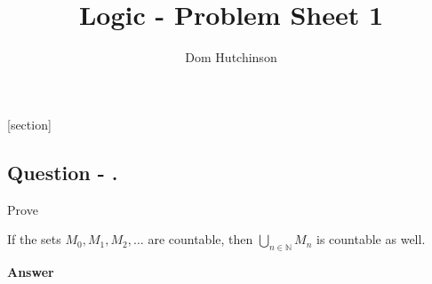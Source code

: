 \documentclass[11pt,a4paper]{article}
\begin{document}
\pagestyle{fancy}
\setlength\parindent{0pt}
\allowdisplaybreaks

\renewcommand{\headrulewidth}{0pt}

\title{Logic - Problem Sheet 1}
\author{Dom Hutchinson}
\maketitle

\fancyhead[R]{\today}

[section]

\newcommand{\dotprod}[0]{\boldsymbol{\cdot}}
\newcommand{\cosech}[0]{\mathrm{cosech}\ }
\newcommand{\cosec}[0]{\mathrm{cosec}\ }
\newcommand{\sech}[0]{\mathrm{sech}\ }
\newcommand{\prob}[0]{\mathbb{P}}
\newcommand{\nats}[0]{\mathbb{N}}
\newcommand{\cov}[0]{\mathrm{cov}}
\newcommand{\var}[0]{\mathrm{var}}
\newcommand{\expect}[0]{\mathbb{E}}
\newcommand{\reals}[0]{\mathbb{R}}
\newcommand{\integers}[0]{\mathbb{Z}}
\newcommand{\indicator}[0]{\mathds{1}}
\newcommand{\nb}[0]{\textit{N.B.} }
\newcommand{\ie}[0]{\textit{i.e.} }
\newcommand{\eg}[0]{\textit{e.g.} }
\newcommand{\iid}[0]{\overset{\text{iid}}{\sim} }
\newcommand{\x}[0]{\textbf{x} }
\newcommand{\X}[0]{\textbf{X} }
\newcommand{\LL}[0]{\mathcal{L}}

\newcommand{\qpart}[0]{\stepcounter{qpart} \textbf{Question \arabic{section} \alph{qpart})\\}}
\newcommand{\qpartnb}[0]{\stepcounter{qpart} \textbf{Question \arabic{section} \alph{qpart})} - }
\newcommand{\ans}[0]{ \textbf{Answer \arabic{section}\\}}
\newcommand{\apart}[0]{ \textbf{Answer \arabic{section} \alph{qpart})\\}}
\newcommand{\apartnb}[0]{ \textbf{Answer \arabic{section} \alph{qpart})} - }
\newcommand{\question}[0]{\subsection*{Question - .}}

\question
Prove
\begin{center}
If the sets $M_0,M_1,M_2,\dots$ are countable, then $\bigcup\limits_{n\in\nats}M_n$ is countable as well.
\end{center}

\ans
\end{document}
